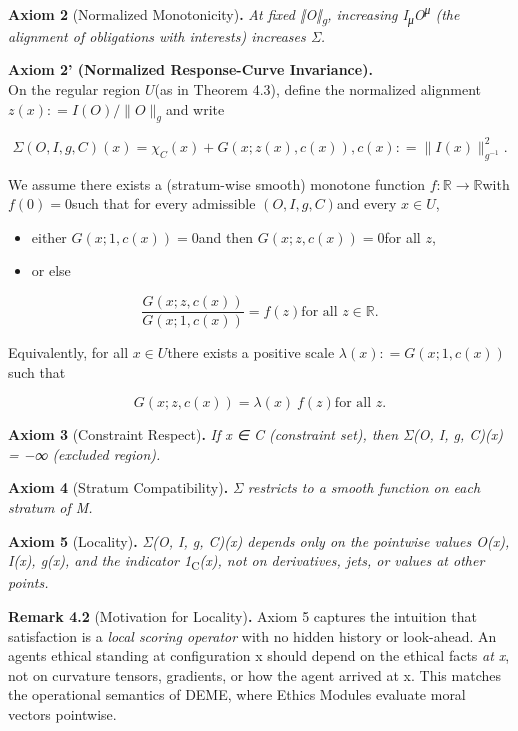 \documentclass[12pt]{article}
\theoremstyle{plain}
\theoremstyle{definition}
\theoremstyle{remark}
\begin{document}
\textbf{Axiom 2} (Normalized Monotonicity)\textbf{.} \emph{At fixed
‖O‖\textsubscript{g}, increasing I\textsubscript{μ}O\textsuperscript{μ}
(the alignment of obligations with interests) increases Σ.}

\textbf{Axiom 2' (Normalized Response-Curve Invariance).}\\
On the regular region \(U\)(as in Theorem 4.3), define the normalized
alignment \(z(x): = I(O)/ \parallel O \parallel_{g}\)and write

\[\Sigma(O,I,g,C)(x) = \chi_{C}(x) + G(x;z(x),c(x)),c(x): = \parallel I(x) \parallel_{g^{- 1}}^{2}.
\]

We assume there exists a (stratum-wise smooth) monotone function
\(f:\mathbb{R} \rightarrow \mathbb{R}\)with \(f(0) = 0\)such that for
every admissible \(\left( O,I,g,C \right)\)and every \(x \in U\),

\begin{itemize}
\item
  either \(G(x;1,c(x)) = 0\)and then \(G(x;z,c(x)) = 0\)for all \(z\),
\item
  or else
\end{itemize}

\[\frac{G(x;z,c(x))}{G(x;1,c(x))} = f(z)\text{for all }z \in \mathbb{R.}
\]

Equivalently, for all \(x \in U\)there exists a positive scale
\(\lambda(x): = G(x;1,c(x))\)such that

\[G(x;z,c(x)) = \lambda(x)\text{ }f(z)\text{for all }z.
\]

\textbf{Axiom 3} (Constraint Respect)\textbf{.} \emph{If x ∈ C
(constraint set), then Σ(O, I, g, C)(x) = −∞ (excluded region).}

\textbf{Axiom 4} (Stratum Compatibility)\textbf{.} \emph{Σ restricts to
a smooth function on each stratum of M.}

\textbf{Axiom 5} (Locality)\textbf{.} \emph{Σ(O, I, g, C)(x) depends
only on the pointwise values O(x), I(x), g(x), and the indicator
1}\textsubscript{C}\emph{(x), not on derivatives, jets, or values at
other points.}

\textbf{Remark 4.2} (Motivation for Locality)\textbf{.} Axiom 5 captures
the intuition that satisfaction is a \emph{local scoring operator} with
no hidden history or look-ahead. An agent\textquotesingle s ethical
standing at configuration x should depend on the ethical facts \emph{at
x}, not on curvature tensors, gradients, or how the agent arrived at x.
This matches the operational semantics of DEME, where Ethics Modules
evaluate moral vectors pointwise.
\end{document}
